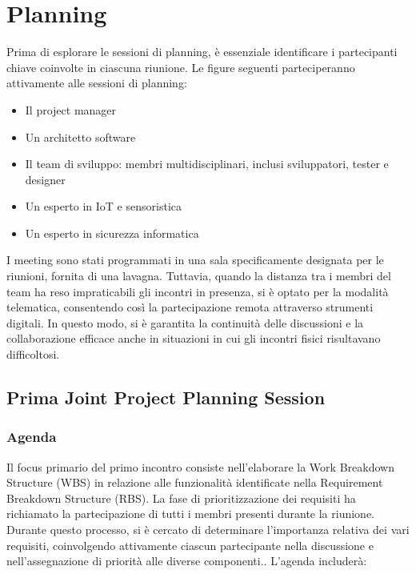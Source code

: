 \chapter{Planning}

Prima di esplorare le sessioni di planning, è essenziale identificare i partecipanti chiave coinvolte in ciascuna riunione. Le figure seguenti parteciperanno attivamente alle sessioni di planning:

\begin{itemize}
    \item Il project manager
    \item Un architetto software
    \item Il team di sviluppo: membri multidisciplinari, inclusi sviluppatori, tester e designer
    \item Un esperto in IoT e sensoristica
    \item Un esperto in sicurezza informatica
\end{itemize}

I meeting sono stati programmati in una sala specificamente designata per le riunioni, fornita di una lavagna. Tuttavia, quando la distanza tra i membri del team ha reso impraticabili gli incontri in presenza, si è optato per la modalità telematica, consentendo così la partecipazione remota attraverso strumenti digitali. In questo modo, si è garantita la continuità delle discussioni e la collaborazione efficace anche in situazioni in cui gli incontri fisici risultavano difficoltosi.

\section{Prima Joint Project Planning Session}

\subsection{Agenda}

Il focus primario del primo incontro consiste nell'elaborare la Work Breakdown Structure (WBS) in relazione alle funzionalità identificate nella Requirement Breakdown Structure (RBS). La fase di prioritizzazione dei requisiti ha richiamato la partecipazione di tutti i membri presenti durante la riunione. Durante questo processo, si è cercato di determinare l'importanza relativa dei vari requisiti, coinvolgendo attivamente ciascun partecipante nella discussione e nell'assegnazione di priorità alle diverse componenti.. L'agenda includerà:

